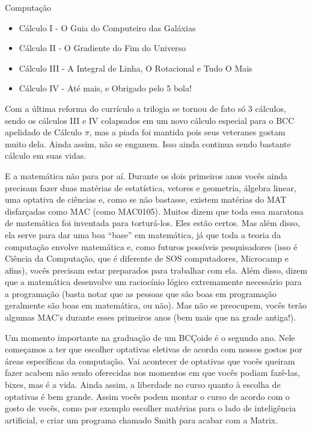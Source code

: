 \begin{subsecao}{Computação}
\begin{itemize}
	\item Cálculo I - O Guia do Computeiro das Galáxias
	\item Cálculo II - O Gradiente do Fim do Universo
	\item Cálculo III - A Integral de Linha, O Rotacional e Tudo O Mais
	\item Cálculo IV - Até mais, e Obrigado pelo 5 bola!
\end{itemize}

Com a última reforma do currículo a trilogia se tornou de fato só 3 cálculos,
sendo os cálculos III e IV colapsados em um novo cálculo especial para o BCC 
apelidado de Cálculo $\pi$, mas a piada foi mantida pois seus veteranes gostam muito
dela. Ainda assim, não se enganem. Isso ainda continua sendo bastante cálculo em
suas vidas.

E a matemática não para por aí. Durante os dois primeiros anos vocês ainda
precisam fazer duas matérias de estatística, vetores e geometria, álgebra
linear, uma optativa de ciências e, como se não bastasse, existem matérias do
MAT disfarçadas como MAC (como MAC0105). Muitos dizem que toda essa maratona de
matemática foi inventada para torturá-los. Eles estão certos. Mas além disso,
ela serve para dar uma boa ``base'' em matemática, já que toda a teoria da
computação envolve matemática e, como futuros possíveis pesquisadores (isso é
Ciência da Computação, que é diferente de SOS computadores, Microcamp e afins),
vocês precisam estar preparados para trabalhar com ela. Além disso, dizem que a
matemática desenvolve um raciocínio lógico extremamente necessário para a
programação (basta notar que as pessoas que são boas em programação geralmente
são boas em matemática, ou não). Mas não se preocupem, vocês terão algumas MAC's
durante esses primeiros anos (bem mais que na grade antiga!).

Um momento importante na graduação de um BCÇoide é o segundo ano. Nele começamos
a ter que escolher optativas eletivas de acordo com nossos gostos por áreas
específicas da computação. Vai acontecer de optativas que vocês queiram fazer
acabem não sendo oferecidas nos momentos em que vocês podiam fazê-las, bixes,
mas é a vida. Ainda assim, a liberdade no curso quanto à escolha de optativas é
bem grande. Assim vocês podem montar o curso de acordo com o gosto de vocês,
como por exemplo escolher matérias para o lado de inteligência artificial, e
criar um programa chamado Smith para acabar com a Matrix.


\end{subsecao}
